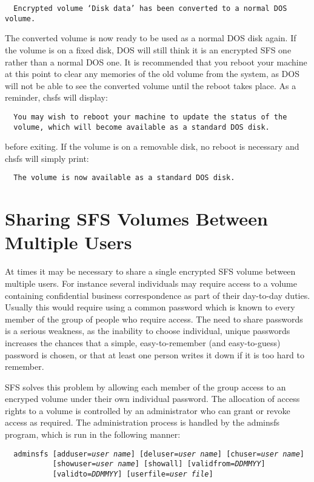 {\small \tt \verb|  |Encrypted volume `Disk data' has been converted to a normal DOS volume.}

The converted volume is now ready to be used as a normal DOS disk again. If the
volume is on a fixed disk, DOS will still think it is an encrypted SFS one
rather than a normal DOS one.  It is recommended that you reboot your machine
at this point to clear any memories of the old volume from the system, as DOS
will not be able to see the converted volume until the reboot takes place.  As
a reminder, chsfs will display:

{\tt \verb|  |You may wish to reboot your machine to update the status of the\\
     \verb|  |volume, which will become available as a standard DOS disk.}

before exiting.  If the volume is on a removable disk, no reboot is necessary
and chsfs will simply print:

{\tt \verb|  |The volume is now available as a standard DOS disk.}



\section{Sharing SFS Volumes Between Multiple Users}

At times it may be necessary to share a single encrypted SFS volume between
multiple users.  For instance several individuals may require access to a
volume containing confidential business correspondence as part of their
day-to-day duties.  Usually this would require using a common password which is
known to every member of the group of people who require access.  The need to
share passwords is a serious weakness, as the inability to choose individual,
unique passwords increases the chances that a simple, easy-to-remember (and
easy-to-guess) password is chosen, or that at least one person writes it down
if it is too hard to remember.

SFS solves this problem by allowing each member of the group access to an
encryped volume under their own individual password.  The allocation of access
rights to a volume is controlled by an administrator who can grant or revoke
access as required.  The administration process is handled by the adminsfs
program, which is run in the following manner:

{\tt \verb|  |adminsfs [adduser={\em user name}] [deluser={\em user name}] [chuser={\em user name}]\\
\verb|           |[showuser={\em user name}] [showall] [validfrom={\em DDMMYY}]\\
\verb|           |[validto={\em DDMMYY}] [userfile={\em user file}]}

